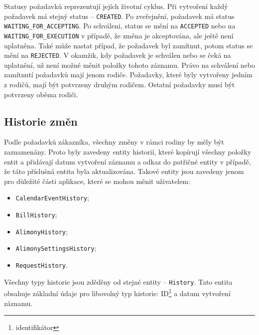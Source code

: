         Statusy požadavků reprezentují jejích životní cyklus. Při vytvoření každý požadavek má stejný status -- \verb|CREATED|. Po zveřejnění, požadavek má status \verb|WAITING_FOR_ACCEPTING|. Po schváleni, status se mění na \verb|ACCEPTED| nebo na \verb|WAITING_FOR_EXECUTION| v případě, že změna je akceptována, ale ještě není uplatněna. Také může nastat případ, že požadavek byl zamítnut, potom status se mění na \verb|REJECTED|. V okamžik, kdy požadavek je schválen nebo se čeká na uplatnění, už není možné měnit položky tohoto záznamu. Právo na schválení nebo zamítnutí požadavků mají jenom rodiče. Požadavky, které byly vytvořeny jedním z rodičů, mají být potvrzeny druhým rodičem. Ostatní požadavky musí být potvrzeny oběma rodiči.
    
    \subsection{Historie změn}
        Podle požadavků zákazníka, všechny změny v rámci rodiny by měly být zaznamenány. Proto byly zavedeny entity historií, které kopírují všechny položky entit a přidávají datum vytvoření záznamu a odkaz do patřičné entity v případě, že táto příslušná entita byla aktualizována. Takové entity jsou zavedeny jenom pro důležité části aplikace, které se mohou měnit uživatelem:
        \begin{itemize}
            \item \texttt{CalendarEventHistory};
            \item \texttt{BillHistory};
            \item \texttt{AlimonyHistory};
            \item \texttt{AlimonySettingsHistory};
            \item \texttt{RequestHistory}.
        \end{itemize}
        Všechny typy historie jsou zděděny od stejné entity -- \verb|History|. Tato entita obsahuje základní údaje pro libovolný typ historie: ID\footnote{identifikátor} a datum vytvoření záznamu. 
     
